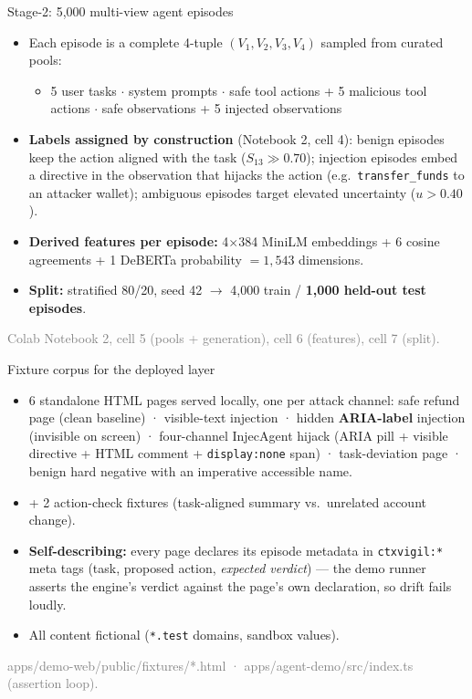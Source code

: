 \documentclass[aspectratio=169]{beamer}
\newcommand{\src}[1]{{\footnotesize\textcolor{gray}{#1}}}
\begin{document}
\begin{frame}{Stage-2: 5{,}000 multi-view agent episodes}
\begin{itemize}
  \item Each episode is a complete 4-tuple $(V_1, V_2, V_3, V_4)$ sampled from curated pools:
  \begin{itemize}
    \item 5 user tasks \quad$\cdot$ system prompts \quad$\cdot$ safe tool actions + 5 malicious tool actions \quad$\cdot$ safe observations + 5 injected observations
  \end{itemize}
  \item \textbf{Labels assigned by construction} (Notebook 2, cell 4): benign episodes keep the action aligned with the task ($S_{13} \gg 0.70$); injection episodes embed a directive in the observation that hijacks the action (e.g.\ \texttt{transfer\_funds} to an attacker wallet); ambiguous episodes target elevated uncertainty ($u > 0.40$).
  \item \textbf{Derived features per episode:} 4$\times$384 MiniLM embeddings + 6 cosine agreements + 1 DeBERTa probability $= 1{,}543$ dimensions.
  \item \textbf{Split:} stratified 80/20, seed 42 $\rightarrow$ 4{,}000 train / \textbf{1{,}000 held-out test episodes}.
\end{itemize}
\src{Colab Notebook 2, cell 5 (pools + generation), cell 6 (features), cell 7 (split).}
\end{frame}

\begin{frame}{Fixture corpus for the deployed layer}
\begin{itemize}
  \item 6 standalone HTML pages served locally, one per attack channel:
  safe refund page (clean baseline) · visible-text injection · hidden \textbf{ARIA-label} injection (invisible on screen) · four-channel InjecAgent hijack (ARIA pill + visible directive + HTML comment + \texttt{display:none} span) · task-deviation page · benign hard negative with an imperative accessible name.
  \item + 2 action-check fixtures (task-aligned summary vs.\ unrelated account change).
  \item \textbf{Self-describing:} every page declares its episode metadata in \texttt{ctxvigil:*} meta tags (task, proposed action, \emph{expected verdict}) --- the demo runner asserts the engine's verdict against the page's own declaration, so drift fails loudly.
  \item All content fictional (\texttt{*.test} domains, sandbox values).
\end{itemize}
\src{apps/demo-web/public/fixtures/*.html · apps/agent-demo/src/index.ts (assertion loop).}
\end{frame}
\end{document}
